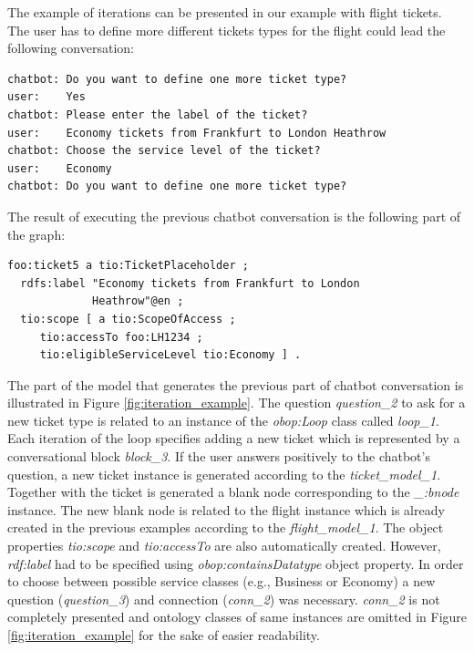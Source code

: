 \documentclass[runningheads]{llncs}
\begin{document}
The example of iterations can be presented in our example with flight tickets. The user has to define more different tickets types for the flight could lead the following conversation:
\begin{lstlisting}[basicstyle=\small,  xleftmargin=0.7cm ]
chatbot: Do you want to define one more ticket type?
user:    Yes
chatbot: Please enter the label of the ticket?
user:    Economy tickets from Frankfurt to London Heathrow
chatbot: Choose the service level of the ticket?
user:    Economy
chatbot: Do you want to define one more ticket type?
\end{lstlisting}
The result of executing the previous chatbot conversation is the following part of the graph:
\begin{lstlisting}[basicstyle=\small,  xleftmargin=0.7cm ]
foo:ticket5 a tio:TicketPlaceholder ;
  rdfs:label "Economy tickets from Frankfurt to London
             Heathrow"@en ;
  tio:scope [ a tio:ScopeOfAccess ;
     tio:accessTo foo:LH1234 ;
     tio:eligibleServiceLevel tio:Economy ] .
\end{lstlisting}
The part of the model that generates the previous part of chatbot conversation is illustrated in Figure \ref{fig:iteration_example}. The question \textit{question\_2} to ask for a new ticket type is related to an instance of the \textit{obop:Loop} class called \textit{loop\_1}. Each iteration of the loop specifies adding a new ticket which is represented by a conversational block \textit{block\_3}. If the user answers positively to the chatbot's question, a new ticket instance is generated according to the \textit{ticket\_model\_1}. Together with the ticket is generated a blank node corresponding to the \textit{\_:bnode} instance. The new blank node is related to the flight instance which is already created in the previous examples according to the \textit{flight\_model\_1}. The object properties \textit{tio:scope} and \textit{tio:accessTo} are also automatically created. However, \textit{rdf:label} had to be specified using \textit{obop:containsDatatype} object property. In order to choose between possible service classes (e.g., Business or Economy) a new question (\textit{question\_3}) and connection (\textit{conn\_2}) was necessary. \textit{conn\_2} is not completely presented and ontology classes of same instances are omitted in Figure \ref{fig:iteration_example} for the sake of easier readability.
\end{document}
